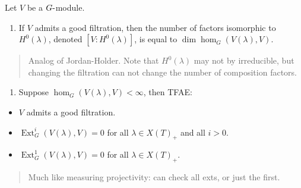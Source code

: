 \begin{theorem}

\begin{theorem}

Let \(V\) be a \(G{\hbox{-}}\)module.

\begin{enumerate}
\def\labelenumi{\arabic{enumi}.}
\tightlist
\item
  If \(V\) admits a good filtration, then the number of factors
  isomorphic to \(H^0(\lambda)\), denoted \([V: H^0(\lambda)]\), is
  equal to \(\dim \hom_G(V(\lambda), V)\).
\end{enumerate}

\begin{quote}
Analog of Jordan-Holder. Note that \(H^0(\lambda)\) may not by
irreducible, but changing the filtration can not change the number of
composition factors.
\end{quote}

\begin{enumerate}
\def\labelenumi{\arabic{enumi}.}
\setcounter{enumi}{1}
\tightlist
\item
  Suppose \(\hom_G(V(\lambda), V)<\infty\), then TFAE:
\end{enumerate}

\begin{itemize}
\tightlist
\item
  \(V\) admits a good filtration.
\item
  \(\operatorname{Ext}^i_G(V(\lambda), V) = 0\) for all
  \(\lambda \in X(T)_+\) and all \(i>0\).
\item
  \(\operatorname{Ext}^1_G(V(\lambda), V) = 0\) for all
  \(\lambda \in X(T)_+\).
\end{itemize}

\begin{quote}
Much like measuring projectivity: can check all exts, or just the first.
\end{quote}

\end{theorem}

\end{theorem}

